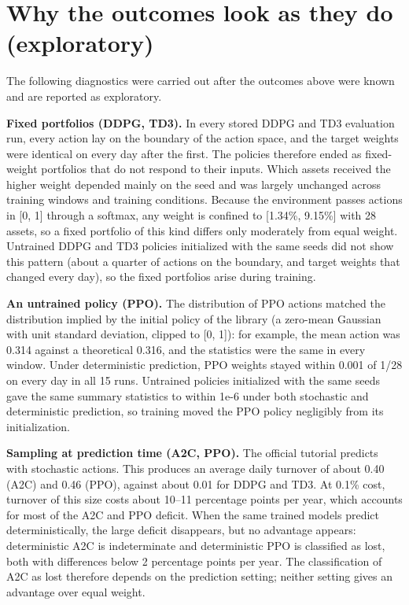 \documentclass[12pt,a4paper]{report}
\begin{document}
\section{Why the outcomes look as they do
(exploratory)}\label{why-the-outcomes-look-as-they-do-exploratory}

The following diagnostics were carried out after the outcomes above were
known and are reported as exploratory.

\textbf{Fixed portfolios (DDPG, TD3).} In every stored DDPG and TD3
evaluation run, every action lay on the boundary of the action space,
and the target weights were identical on every day after the first. The
policies therefore ended as fixed-weight portfolios that do not respond
to their inputs. Which assets received the higher weight depended mainly
on the seed and was largely unchanged across training windows and
training conditions. Because the environment passes actions in {[}0,
1{]} through a softmax, any weight is confined to {[}1.34\%, 9.15\%{]}
with 28 assets, so a fixed portfolio of this kind differs only
moderately from equal weight. Untrained DDPG and TD3 policies
initialized with the same seeds did not show this pattern (about a
quarter of actions on the boundary, and target weights that changed
every day), so the fixed portfolios arise during training.

\textbf{An untrained policy (PPO).} The distribution of PPO actions
matched the distribution implied by the initial policy of the library (a
zero-mean Gaussian with unit standard deviation, clipped to {[}0, 1{]}):
for example, the mean action was 0.314 against a theoretical 0.316, and
the statistics were the same in every window. Under deterministic
prediction, PPO weights stayed within 0.001 of 1/28 on every day in all
15 runs. Untrained policies initialized with the same seeds gave the
same summary statistics to within 1e-6 under both stochastic and
deterministic prediction, so training moved the PPO policy negligibly
from its initialization.

\textbf{Sampling at prediction time (A2C, PPO).} The official tutorial
predicts with stochastic actions. This produces an average daily
turnover of about 0.40 (A2C) and 0.46 (PPO), against about 0.01 for DDPG
and TD3. At 0.1\% cost, turnover of this size costs about 10--11
percentage points per year, which accounts for most of the A2C and PPO
deficit. When the same trained models predict deterministically, the
large deficit disappears, but no advantage appears: deterministic A2C is
indeterminate and deterministic PPO is classified as lost, both with
differences below 2 percentage points per year. The classification of
A2C as lost therefore depends on the prediction setting; neither setting
gives an advantage over equal weight.
\end{document}
